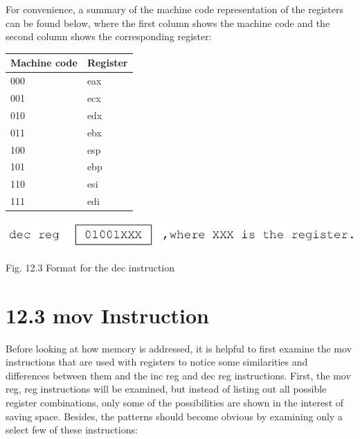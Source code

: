 \documentclass[10pt]{article}
\begin{document}
For convenience, a summary of the machine code representation of the registers can be found below, where the first column shows the machine code and the second column shows the corresponding register:

\begin{center}
\begin{tabular}{|l|l|}
\hline
Machine code & Register \\
\hline
000 & eax \\
\hline
001 & ecx \\
\hline
010 & edx \\
\hline
011 & ebx \\
\hline
100 & esp \\
\hline
101 & ebp \\
\hline
110 & esi \\
\hline
111 & edi \\
\hline
\end{tabular}
\end{center}

\begin{center}
\includegraphics[max width=\textwidth]{2025_03_24_ebe50cc223a6fbc49eecg-277}
\end{center}

Fig. 12.3 Format for the dec instruction

\section*{12.3 mov Instruction}
Before looking at how memory is addressed, it is helpful to first examine the mov instructions that are used with registers to notice some similarities and differences between them and the inc reg and dec reg instructions. First, the mov reg, reg instructions will be examined, but instead of listing out all possible register combinations, only some of the possibilities are shown in the interest of saving space. Besides, the patterns should become obvious by examining only a select few of these instructions:
\end{document}
